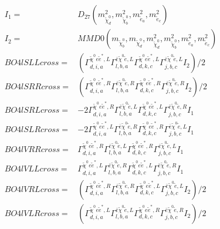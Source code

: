 \documentclass[A4,landscape]{article}
\begin{document}
\begin{align} 
I_1 = & D_{27}(m^2_{\tilde{\chi}^0_{{d}}}, m^2_{\tilde{\chi}^0_{{b}}}, m^2_{\tilde{e}_{{a}}}, m^2_{\tilde{e}_{{c}}}) \\ 
I_2 = & MMD0(m_{\tilde{\chi}^0_{{b}}}, m_{\tilde{\chi}^0_{{d}}}, m^2_{\tilde{\chi}^0_{{d}}}, m^2_{\tilde{\chi}^0_{{b}}}, m^2_{\tilde{e}_{{a}}}, m^2_{\tilde{e}_{{c}}}) \\ 
  BO4lSLLcross= & ( \Gamma^{\tilde{\chi}^0 e \tilde{e}^*,L}_{d, i, a} \Gamma^{\bar{e}\tilde{\chi}^0 \tilde{e} ,L}_{l, b, a} \Gamma^{\tilde{\chi}^0 e \tilde{e}^*,L}_{d, k, c} \Gamma^{\bar{e}\tilde{\chi}^0 \tilde{e} ,L}_{j, b, c} I_2)/2 \\ 
  BO4lSRRcross= & ( \Gamma^{\tilde{\chi}^0 e \tilde{e}^*,R}_{d, i, a} \Gamma^{\bar{e}\tilde{\chi}^0 \tilde{e} ,R}_{l, b, a} \Gamma^{\tilde{\chi}^0 e \tilde{e}^*,R}_{d, k, c} \Gamma^{\bar{e}\tilde{\chi}^0 \tilde{e} ,R}_{j, b, c} I_2)/2 \\ 
  BO4lSRLcross= & -2  \Gamma^{\tilde{\chi}^0 e \tilde{e}^*,R}_{d, i, a} \Gamma^{\bar{e}\tilde{\chi}^0 \tilde{e} ,L}_{l, b, a} \Gamma^{\tilde{\chi}^0 e \tilde{e}^*,L}_{d, k, c} \Gamma^{\bar{e}\tilde{\chi}^0 \tilde{e} ,R}_{j, b, c} I_1 \\ 
  BO4lSLRcross= & -2  \Gamma^{\tilde{\chi}^0 e \tilde{e}^*,L}_{d, i, a} \Gamma^{\bar{e}\tilde{\chi}^0 \tilde{e} ,R}_{l, b, a} \Gamma^{\tilde{\chi}^0 e \tilde{e}^*,R}_{d, k, c} \Gamma^{\bar{e}\tilde{\chi}^0 \tilde{e} ,L}_{j, b, c} I_1 \\ 
  BO4lVRRcross= &  \Gamma^{\tilde{\chi}^0 e \tilde{e}^*,R}_{d, i, a} \Gamma^{\bar{e}\tilde{\chi}^0 \tilde{e} ,L}_{l, b, a} \Gamma^{\tilde{\chi}^0 e \tilde{e}^*,R}_{d, k, c} \Gamma^{\bar{e}\tilde{\chi}^0 \tilde{e} ,L}_{j, b, c} I_1 \\ 
  BO4lVLLcross= &  \Gamma^{\tilde{\chi}^0 e \tilde{e}^*,L}_{d, i, a} \Gamma^{\bar{e}\tilde{\chi}^0 \tilde{e} ,R}_{l, b, a} \Gamma^{\tilde{\chi}^0 e \tilde{e}^*,L}_{d, k, c} \Gamma^{\bar{e}\tilde{\chi}^0 \tilde{e} ,R}_{j, b, c} I_1 \\ 
  BO4lVRLcross= & ( \Gamma^{\tilde{\chi}^0 e \tilde{e}^*,R}_{d, i, a} \Gamma^{\bar{e}\tilde{\chi}^0 \tilde{e} ,R}_{l, b, a} \Gamma^{\tilde{\chi}^0 e \tilde{e}^*,L}_{d, k, c} \Gamma^{\bar{e}\tilde{\chi}^0 \tilde{e} ,L}_{j, b, c} I_2)/2 \\ 
  BO4lVLRcross= & ( \Gamma^{\tilde{\chi}^0 e \tilde{e}^*,L}_{d, i, a} \Gamma^{\bar{e}\tilde{\chi}^0 \tilde{e} ,L}_{l, b, a} \Gamma^{\tilde{\chi}^0 e \tilde{e}^*,R}_{d, k, c} \Gamma^{\bar{e}\tilde{\chi}^0 \tilde{e} ,R}_{j, b, c} I_2)/2 \\ 

\end{align}
\end{document}
